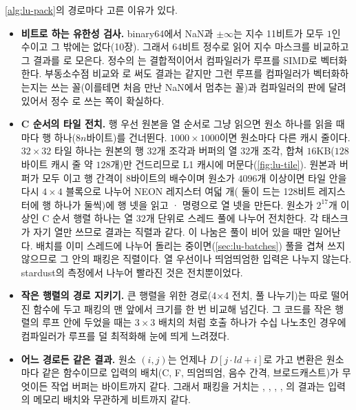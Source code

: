 \cref{alg:lu-pack}의 경로마다 고른 이유가 있다.
\begin{itemize}
\item \textbf{비트로 하는 유한성 검사.} binary64에서 NaN과 $\pm\infty$는 지수 11비트가 모두 $1$인 수이고 그 밖에는 없다(10장). 그래서 64비트 정수로 읽어 지수 마스크를 비교하고 그 결과를 로 모은다. 정수의 는 결합적이어서 컴파일러가 루프를 SIMD로 벡터화한다. 부동소수점 비교와 로 써도 결과는 같지만 그런 루프를 컴파일러가 벡터화하는지는 쓰는 꼴(이를테면 처음 만난 NaN에서 멈추는 꼴)과 컴파일러의 판에 달려 있어서 정수 로 쓰는 쪽이 확실하다.
\item \textbf{C 순서의 타일 전치.} 행 우선 원본을 열 순서로 그냥 읽으면 원소 하나를 읽을 때마다 행 하나($8n$바이트)를 건너뛴다. $1000\times1000$이면 원소마다 다른 캐시 줄이다. $32\times32$ 타일 하나는 원본의 행 32개 조각과 버퍼의 열 32개 조각, 합쳐 $16$KB($128$바이트 캐시 줄 약 $128$개)만 건드리므로 L1 캐시에 머문다(\cref{fig:lu-tile}). 원본과 버퍼가 모두 이고 행 간격이 8바이트의 배수이며 원소가 $4096$개 이상이면 타일 안을 다시 $4\times4$ 블록으로 나누어 NEON 레지스터 여덟 개( 둘이 드는 128비트 레지스터에 행 하나가 둘씩)에 행 넷을 읽고 · 명령으로 열 넷을 만든다. 원소가 $2^{17}$개 이상인 C 순서 행렬 하나는 열 $32$개 단위로 스레드 풀에 나누어 전치한다. 각 태스크가 자기 열만 쓰므로 결과는 직렬과 같다. 이 나눔은 풀이 비어 있을 때만 일어난다. 배치를 이미 스레드에 나누어 돌리는 중이면(\cref{sec:lu-batches}) 풀을 겹쳐 쓰지 않으므로 그 안의 패킹은 직렬이다. 열 우선이나 띄엄띄엄한 입력은 나누지 않는다. stardust의 측정에서 나누어 빨라진 것은 전치뿐이었다.
\item \textbf{작은 행렬의 경로 지키기.} 큰 행렬을 위한 경로(4×4 전치, 풀 나누기)는 따로 떨어진 함수에 두고 패킹의 맨 앞에서 크기를 한 번 비교해 넘긴다. 그 코드를 작은 행렬의 루프 안에 두었을 때는 $3\times3$ 배치의 처럼 호출 하나가 수십 나노초인 경우에 컴파일러가 루프를 덜 최적화해 눈에 띄게 느려졌다.
\item \textbf{어느 경로든 같은 결과.} 원소 $(i,j)$는 언제나 $D[j\cdot\mathit{ld}+i]$로 가고 변환은 원소마다 같은 함수이므로 입력의 배치(C, F, 띄엄띄엄, 음수 간격, 브로드캐스트)가 무엇이든 작업 버퍼는 바이트까지 같다. 그래서 패킹을 거치는 , , , , 의 결과는 입력의 메모리 배치와 무관하게 비트까지 같다.
\end{itemize}

